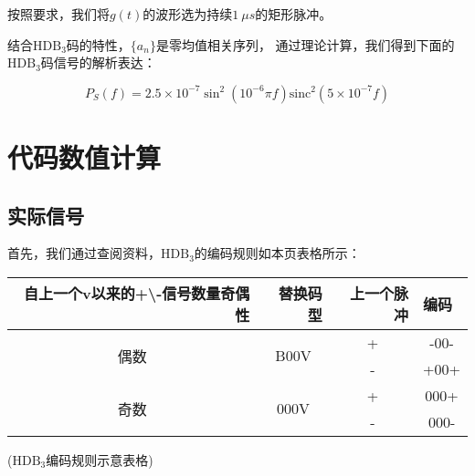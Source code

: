 \documentclass[AutoFakeBold]{LZUThesis}
\begin{document}
按照要求，我们将$g(t)$的波形选为持续$1~\mu s$的矩形脉冲。

结合$\mathrm{HDB_3}$码的特性，$\{a_n\}$是零均值相关序列，
通过理论计算，我们得到下面的$\mathrm{HDB_3}$码信号的解析表达：

\begin{equation}
    P_S(f) = 2.5\times 10^{-7}\sin^2{(10^{-6}\pi f)} \mathrm{sinc}^2 (5\times 10^{-7} f)
\end{equation}

\section{代码数值计算}
\subsection{实际信号}

首先，我们通过查阅资料，$\mathrm{HDB_3}$的编码规则如本页表格所示：

\begin{table}[]
    \begin{center}
        \begin{threeparttable}
        \begin{tabular}{|c|c|c|c|}
    \hline
    \multicolumn{1}{|r|}{自上一个v以来的+\textbackslash{}-信号数量奇偶性} & \multicolumn{1}{r|}{替换码型} & \multicolumn{1}{r|}{上一个脉冲} & \multicolumn{1}{l|}{编码} \\ \hline
    \multirow{2}{*}{偶数}                                     & \multirow{2}{*}{B00V}     & +                          & -00-                    \\ \cline{3-4} 
                                                            &                           & -                          & +00+                    \\ \hline
    \multirow{2}{*}{奇数}                                     & \multirow{2}{*}{000V}     & +                          & 000+                    \\ \cline{3-4} 
                                                            &                           & -                          & 000-                    \\ \hline
    \end{tabular}

\begin{tablenotes}
    \footnotesize
    \item \begin{center}($\mathrm{HDB_3}$编码规则示意表格)\end{center}
  \end{tablenotes}
\end{threeparttable}
\end{center}
    \end{table}
\end{document}

